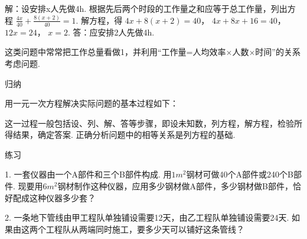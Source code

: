 \documentclass{article}
\begin{document}
\maketitle

\begin{example}
解：设安排x人先做4h.\newline
根据先后两个时段的工作量之和应等于总工作量，列出方程\newline
$\frac{4x}{40}+\frac{8(x+2)}{40}=1$.\newline
解方程，得\newline
$4x+8(x+2)=40$，\newline
$4x+8x+16=40$，\newline
$12x=24$，\newline
$x=2$.\newline
答：应安排2人先做4h.\newline

这类问题中常常把工作总量看做1，并利用“工作量=人均效率$\times$人数$\times$时间”的关系考虑问题.\newline

归纳\newline

用一元一次方程解决实际问题的基本过程如下：\newline

这一过程一般包括设、列、解、答等步骤，即设未知数，列方程，解方程，检验所得结果，确定答案. 正确分析问题中的相等关系是列方程的基础.\newline
\end{example}
\begin{exercise}
练习\newline

1. 一套仪器由一个A部件和三个B部件构成. 用${1m^2}$钢材可做40个A部件或240个B部件. 现要用$6{m^2}$钢材制作这种仪器，应用多少钢材做A部件，多少钢材做B部件，恰好配成这种仪器多少套？\newline

2. 一条地下管线由甲工程队单独铺设需要12天，由乙工程队单独铺设需要24天. 如果由这两个工程队从两端同时施工，要多少天可以铺好这条管线？\newline
\end{exercise}
\end{document}

